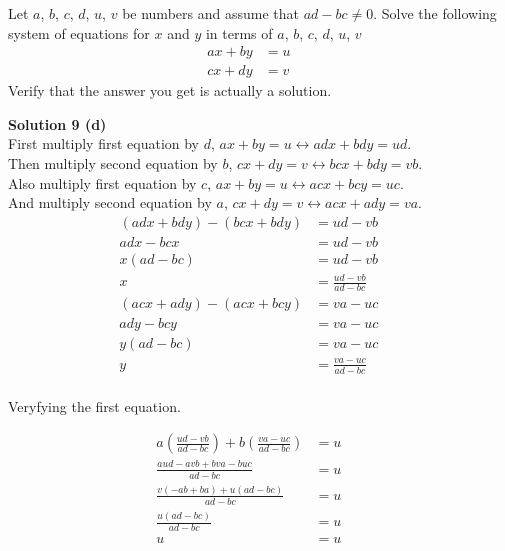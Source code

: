 \begin{tcolorbox}[title=Problem 11, breakable]
    Let $a$, $b$, $c$, $d$, $u$, $v$ be numbers and assume that $ad - bc \not = 0$. 
    Solve the following system of equations for $x$ and $y$ in terms of 
    $a$, $b$, $c$, $d$, $u$, $v$
    \begin{align*}
        ax + by &= u && \\
        cx + dy &= v
    \end{align*}
    Verify that the answer you get is actually a solution.
\end{tcolorbox}


\textbf{Solution 9 (d)} \\
First multiply first equation by $d$, $ax + by = u \leftrightarrow adx + bdy = ud$. \\
Then multiply second equation by $b$, $cx + dy = v \leftrightarrow bcx + bdy = vb$. \\
Also multiply first equation by $c$, $ax + by = u \leftrightarrow acx + bcy = uc$. \\
And multiply second equation by $a$, $cx + dy = v \leftrightarrow acx + ady = va$. 
\begin{align*}
    (adx + bdy) - (bcx + bdy) &= ud - vb && \\
    adx - bcx &= ud - vb && \\
    x(ad - bc) &= ud - vb && \\
    x &= \frac{ud - vb}{ad - bc}
\end{align*}
\begin{align*}
    (acx + ady) - (acx + bcy) &= va - uc && \\
    ady - bcy &= va - uc && \\
    y(ad - bc) &= va - uc && \\
    y &= \frac{va - uc}{ad - bc} && \\
\end{align*}

Veryfying the first equation.

\begin{align*}
    a\left(\frac{ud - vb}{ad - bc}\right) + b\left(\frac{va - uc}{ad - bc}\right) &= u && \\
    \frac{aud - avb + bva - buc}{ad - bc} &= u && \\
    \frac{v(-ab + ba) + u(ad - bc)}{ad - bc} &= u && \\
    \frac{u(ad - bc)}{ad - bc} &= u && \\
    u &= u
\end{align*}

